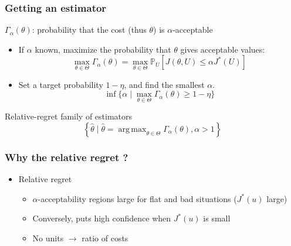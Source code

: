 \documentclass[11pt]{beamer}
\newcommand{\Prob}{\mathbb{P}}
\DeclareMathOperator*{\argmax}{arg\,max}
\newcommand{\kk}{\theta}
\newcommand{\uu}{u}
\newcommand{\UU}{U}
\newcommand{\Kspace}{\Theta}
\newcommand\manupath{/home/victor/acadwriting/Manuscrit/Text/}
\begin{document}
\begin{frame}
  
  \frametitle{Getting an estimator}
  $\Gamma_{\alpha}(\kk)$: probability that the cost (thus $\kk$) is $\alpha$-acceptable
  \begin{itemize}
  \item If $\alpha$ known, maximize the probability that $\kk$ gives acceptable values:
    \begin{equation}
      \max_{\kk\in\Kspace} \Gamma_{\alpha}(\kk) = \max_{\kk\in\Kspace}\Prob_{\UU}\left[J(\kk, \UU) \leq \alpha J^*(\UU)\right]
    \end{equation}
  \item Set a target probability $1-\eta$, and find the smallest $\alpha$.
    \begin{equation}
      \inf\{ \alpha \mid \max_{\kk\in\Kspace}\Gamma_{\alpha}(\kk) \geq 1 - \eta \}
    \end{equation}
  \end{itemize}

  \begin{block}{Relative-regret family of estimators~\citep{trappler_robust_2020}}
  \begin{equation}
   \left\{ \hat{\kk} \mid \hat{\kk} = \argmax_{\kk \in \Kspace} \Gamma_{\alpha}(\kk), \alpha>1 \right\}
  \end{equation}
\end{block}
\end{frame}

\begin{frame}
  \frametitle{Why the relative regret ?}


  
  \renewcommand\rmfamily{\sffamily}
  \begin{center}
  \resizebox{.6\textwidth}{!}{}
\end{center}
  \begin{itemize}
  \item Relative regret
    \begin{itemize}
    \item $\alpha$-acceptability regions large for flat and bad situations ($J^*(\uu)$ large)
    \item Conversely, puts high confidence when $J^*(\uu)$ is small
    \item No units $\rightarrow$ ratio of costs
    \end{itemize}
  \end{itemize}
\end{frame}
\end{document}
